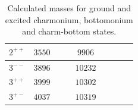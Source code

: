 \begin{table}[!t]
\begin{center}
\begin{tabular}{c|ccc|ccc||c|c}
$2^{++}$    & $3550$  &        &        & $9906$   &        &    	&      &                                      \\
\hline                                                                                                                                                                                                     
$3^{--}$    & $3896$ &         &        & $10232$  &        &    	&      &                                           \\
$3^{++}$    & $3999$ &         &        & $10302$  &        &    	&       &                                     \\
$3^{+-}$    & $4037$ &         &        & $10319$  &        &    	&      &                                                   \\                                                                                                                                                                      
\hline
\hline
\end{tabular}
\caption{Calculated masses for ground and excited charmonium, bottomonium and charm-bottom states.}\label{tab:results_heavy}
\end{center}
\end{table} \\


